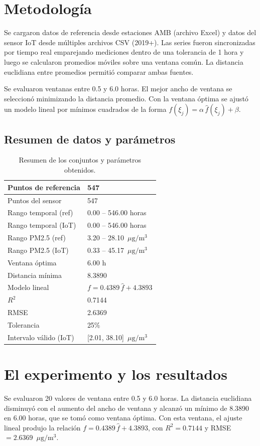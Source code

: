 \documentclass[spanish,notitlepage,letterpaper,11pt]{article} %
\begin{document}
\section{Metodología}
\label{Metodologia}
Se cargaron datos de referencia desde estaciones AMB (archivo Excel) y datos del sensor IoT desde múltiples archivos CSV (2019+). Las series fueron sincronizadas por tiempo real emparejando mediciones dentro de una tolerancia de 1 hora y luego se calcularon promedios móviles sobre una ventana común. La distancia euclidiana entre promedios permitió comparar ambas fuentes.

Se evaluaron ventanas entre 0.5 y 6.0 horas. El mejor ancho de ventana se seleccionó minimizando la distancia promedio. Con la ventana óptima se ajustó un modelo lineal por mínimos cuadrados de la forma $f(\xi_j)=\alpha\,\hat f(\xi_j)+\beta$.

\subsection{Resumen de datos y parámetros}
\begin{table}[h]
  \centering
\begin{tabular}{l|l}
\hline
Puntos de referencia & 547 \\ \hline
Puntos del sensor & 547 \\ \hline
Rango temporal (ref) & 0.00 -- 546.00 horas \\ \hline
Rango temporal (IoT) & 0.00 -- 546.00 horas \\ \hline
Rango PM2.5 (ref) & 3.20 -- 28.10~$\mu\mathrm{g}/\mathrm{m}^3$ \\ \hline
Rango PM2.5 (IoT) & 0.33 -- 45.17~$\mu\mathrm{g}/\mathrm{m}^3$ \\ \hline
Ventana óptima & 6.00 h \\ \hline
Distancia mínima & 8.3890 \\ \hline
Modelo lineal & $f=0.4389\,\hat f + 4.3893$ \\ \hline
$R^2$ & 0.7144 \\ \hline
RMSE & 2.6369 \\ \hline
Tolerancia & 25\% \\ \hline
Intervalo válido (IoT) & [2.01, 38.10]~$\mu\mathrm{g}/\mathrm{m}^3$ \\ \hline
\end{tabular}
\caption{Resumen de los conjuntos y parámetros obtenidos.}
\label{TablaResumen}
\end{table}

\section{El experimento y los resultados}
\label{Resultados}
Se evaluaron 20 valores de ventana entre 0.5 y 6.0 horas. La distancia euclidiana disminuyó con el aumento del ancho de ventana y alcanzó un mínimo de 8.3890 en 6.00 horas, que se tomó como ventana óptima. Con esta ventana, el ajuste lineal produjo la relación $f=0.4389\,\hat{f} + 4.3893$, con $R^2=0.7144$ y RMSE $=2.6369$~$\mu\mathrm{g}/\mathrm{m}^3$.
\end{document}
